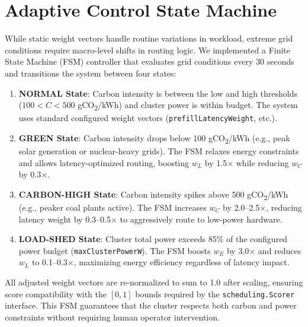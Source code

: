 \section{Adaptive Control State Machine}
\label{sec:adaptive-fsm}

While static weight vectors handle routine variations in workload, extreme grid conditions require macro-level shifts in routing logic. We implemented a Finite State Machine (FSM) controller that evaluates grid conditions every 30 seconds and transitions the system between four states:

\begin{enumerate}
    \item \textbf{NORMAL State}: Carbon intensity is between the low and high thresholds ($100 < C < 500$ gCO\textsubscript{2}/kWh) and cluster power is within budget. The system uses standard configured weight vectors (\texttt{prefillLatencyWeight}, etc.).
    \item \textbf{GREEN State}: Carbon intensity drops below 100 gCO\textsubscript{2}/kWh (e.g., peak solar generation or nuclear-heavy grids). The FSM relaxes energy constraints and allows latency-optimized routing, boosting $w_L$ by 1.5$\times$ while reducing $w_C$ by 0.3$\times$.
    \item \textbf{CARBON-HIGH State}: Carbon intensity spikes above 500 gCO\textsubscript{2}/kWh (e.g., peaker coal plants active). The FSM increases $w_C$ by 2.0--2.5$\times$, reducing latency weight by 0.3--0.5$\times$ to aggressively route to low-power hardware.
    \item \textbf{LOAD-SHED State}: Cluster total power exceeds 85\% of the configured power budget (\texttt{maxClusterPowerW}). The FSM boosts $w_E$ by 3.0$\times$ and reduces $w_L$ to 0.1--0.3$\times$, maximizing energy efficiency regardless of latency impact.
\end{enumerate}

All adjusted weight vectors are re-normalized to sum to 1.0 after scaling, ensuring score compatibility with the $[0, 1]$ bounds required by the \texttt{scheduling.Scorer} interface. This FSM guarantees that the cluster respects both carbon and power constraints without requiring human operator intervention.


